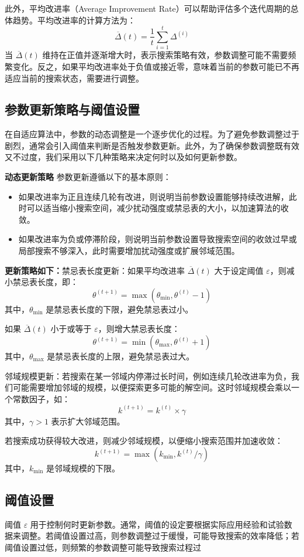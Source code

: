 \documentclass[12pt,a4paper,twoside]{ctexbook}
\begin{document}
此外，平均改进率（Average Improvement Rate）可以帮助评估多个迭代周期的总体趋势。平均改进率的计算方法为：
\[
\overline{\Delta}(t) = \frac{1}{t} \sum_{i=1}^{t} \Delta^{(i)}
\]
当 $\overline{\Delta}(t)$ 维持在正值并逐渐增大时，表示搜索策略有效，参数调整可能不需要频繁变化。反之，如果平均改进率处于负值或接近零，意味着当前的参数可能已不再适应当前的搜索状态，需要进行调整。

\subsection{参数更新策略与阈值设置}
在自适应算法中，参数的动态调整是一个逐步优化的过程。为了避免参数调整过于剧烈，通常会引入阈值来判断是否触发参数更新。此外，为了确保参数调整既有效又不过度，我们采用以下几种策略来决定何时以及如何更新参数。

\textbf{动态更新策略}
参数更新遵循以下的基本原则：
\begin{itemize}
    \item 如果改进率为正且连续几轮有改进，则说明当前参数设置能够持续改进解，此时可以适当缩小搜索空间，减少扰动强度或禁忌表的大小，以加速算法的收敛。
    \item 如果改进率为负或停滞阶段，则说明当前参数设置导致搜索空间的收敛过早或局部搜索不够深入，此时需要增加扰动强度或扩展邻域范围。
\end{itemize}

\textbf{更新策略如下：}禁忌表长度更新：如果平均改进率 $\overline{\Delta}(t)$ 大于设定阈值 $\varepsilon$，则减小禁忌表长度，即：
\[
\theta^{(t+1)} = \max(\theta_{\min}, \theta^{(t)} - 1)
\]
其中，$\theta_{\min}$ 是禁忌表长度的下限，避免禁忌表过小。

如果 $\overline{\Delta}(t)$ 小于或等于 $\varepsilon$，则增大禁忌表长度：
\[
\theta^{(t+1)} = \min(\theta_{\max}, \theta^{(t)} + 1)
\]
其中，$\theta_{\max}$ 是禁忌表长度的上限，避免禁忌表过大。

邻域规模更新：若搜索在某一邻域内停滞过长时间，例如连续几轮改进率为负，我们可能需要增加邻域的规模，以便探索更多可能的解空间。这时邻域规模会乘以一个常数因子，如：
\[
k^{(t+1)} = k^{(t)} \times \gamma
\]
其中，$\gamma > 1$ 表示扩大邻域范围。

若搜索成功获得较大改进，则减少邻域规模，以便缩小搜索范围并加速收敛：
\[
k^{(t+1)} = \max(k_{\min}, k^{(t)} / \gamma)
\]
其中，$k_{\min}$ 是邻域规模的下限。

\subsection{阈值设置}
阈值 $\varepsilon$ 用于控制何时更新参数。通常，阈值的设定要根据实际应用经验和试验数据来调整。若阈值设置过高，则参数调整过于缓慢，可能导致搜索的效率降低；若阈值设置过低，则频繁的参数调整可能导致搜索过程过
\end{document}
